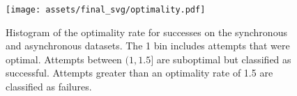 \begin{figure}[!h]
    \centering
    \texttt{[image: assets/final\_svg/optimality.pdf]}
    \caption{Histogram of the optimality rate for \gptfo{} \react{} successes on the synchronous and asynchronous datasets. The 1 bin includes attempts that were optimal. Attempts between $(1, 1.5]$ are suboptimal but classified as successful. Attempts greater than an optimality rate of 1.5 are classified as failures.
    }
    \label{fig:histogram_optimality}
\end{figure}